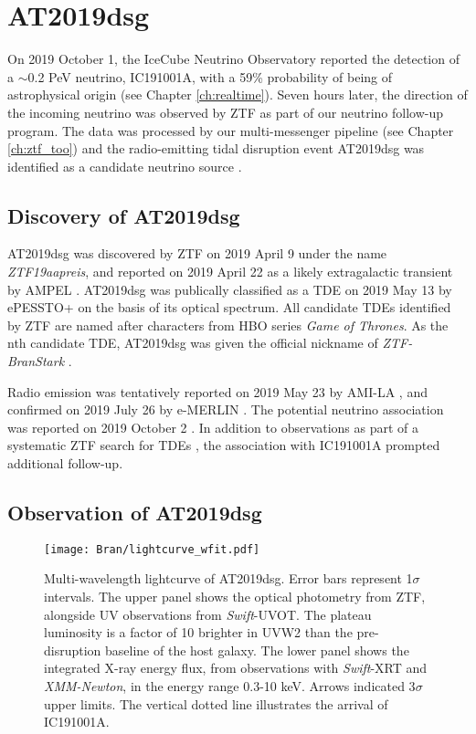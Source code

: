 \setchapterpreamble[u]{\margintoc}
\chapter{AT2019dsg}

On 2019 October 1, the IceCube Neutrino Observatory reported the detection of a $\sim$0.2 PeV neutrino, IC191001A, with a 59\% probability of being of astrophysical origin \cite{stein:gcn25913} (see Chapter \ref{ch:realtime}). Seven hours later, the direction of the incoming neutrino was observed by ZTF as part of our neutrino follow-up program. The data was processed by our multi-messenger pipeline (see Chapter \ref{ch:ztf_too}) and the radio-emitting tidal disruption event AT2019dsg was identified as a candidate neutrino source \cite{2019ATel13160....1S}.

\section{Discovery of AT2019dsg}

AT2019dsg was discovered by ZTF on 2019 April 9 under the name \emph{ZTF19aapreis}, and reported on 2019 April 22 as a likely extragalactic transient by AMPEL . AT2019dsg was publically classified as a TDE on 2019 May 13 by ePESSTO+ on the basis of its optical spectrum.  All candidate TDEs identified by ZTF are named after characters from HBO series \emph{Game of Thrones}. As the nth candidate TDE, AT2019dsg was given the official nickname of \emph{ZTF-BranStark} . 

Radio emission was tentatively reported on 2019 May 23 by AMI-LA \cite{2019ATel12798....1S}, and confirmed on 2019 July 26 by e-MERLIN \cite{2019ATel12960....1P}. The potential neutrino association was reported on 2019 October 2 . In addition to observations as part of a systematic ZTF search for TDEs \cite{2020arXiv200101409V}, the association with IC191001A prompted additional follow-up. 

\section{Observation of AT2019dsg}

\begin{figure}[!ht]
	\texttt{[image: Bran/lightcurve\_wfit.pdf]}
	\caption{Multi-wavelength lightcurve of AT2019dsg. Error bars represent 1$\sigma$ intervals. The upper panel shows the optical photometry from ZTF, alongside UV observations from \textit{Swift}-UVOT. The plateau luminosity is a factor of 10 brighter in UVW2 than the pre-disruption baseline of the host galaxy. The lower panel shows the integrated X-ray energy flux, from observations with \textit{Swift}-XRT and \textit{XMM-Newton}, in the energy range 0.3-10 keV. Arrows indicated 3$\sigma$ upper limits.  The vertical dotted line illustrates the arrival of IC191001A.}
	\label{fig:bran_lightcurve}
\end{figure}

